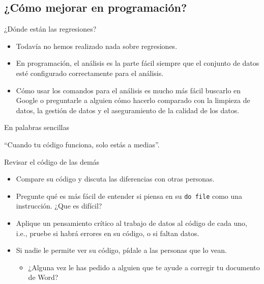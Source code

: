 \documentclass[11pt, aspectratio=169, compress]{beamer}
\begin{document}
\subsection{¿Cómo mejorar en programación?}
\begin{frame}{¿Dónde están las regresiones?}
	\begin{itemize}
		\item Todavía no hemos realizado nada sobre regresiones. 
		\item En programación, el análisis es la parte fácil siempre que el conjunto de datos esté configurado correctamente para el análisis.
		\item Cómo usar los comandos para el análisis es mucho más fácil buscarlo en Google o preguntarle a alguien cómo hacerlo comparado con  la limpieza de datos, la gestión de datos y el aseguramiento de la calidad de los datos.
	\end{itemize}
\end{frame}
\begin{frame}{En palabras sencillas}
	\begin{center}
		``Cuando tu código funciona, solo estás a medias''. 
	\end{center}
\end{frame}
\begin{frame}{Revisar el código de las demás}
	\begin{itemize}
		\item Compare su código y discuta las diferencias con otras personas.
		\item Pregunte qué es más fácil de entender si piensa en su \texttt{do file} como una instrucción. ¿Que es difícil?
		\item Aplique un pensamiento crítico al trabajo de datos al código de cada uno, i.e., pruebe si habrá errores en su código, o si faltan datos.
		\item Si nadie le permite ver su código, pídale a las personas que lo vean. 
		\begin{itemize}
			\item ¿Alguna vez le has pedido a alguien que te ayude a corregir tu documento de Word?
		\end{itemize}
	\end{itemize}
\end{frame}
\end{document}
